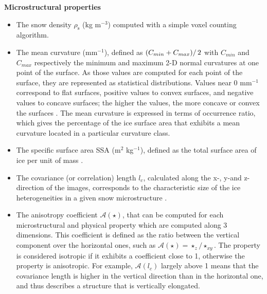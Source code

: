 \documentclass[draft,ms]{agujournal2019}
\begin{document}
\noindent \textbf{Microstructural properties} 
\begin{itemize}
    \item The snow density $\rho_{\mathrm{s}}$ (kg m$^{-3}$) computed with a simple voxel counting algorithm.
    
    \item The mean curvature (mm$^{-1}$), defined as $\left(C_{min} + C_{max})\right/2$ with $C_{min}$ and $C_{max}$ respectively the minimum and maximum 2-D normal curvatures at one point of the surface. As those values are computed for each point of the surface, they are represented as statistical distributions. Values near 0 mm$^{-1}$ correspond to flat surfaces, positive values to convex surfaces, and negative values to concave surfaces; the higher the values, the more concave or convex the surfaces \cite{ogawa2006representation}. The mean curvature is expressed in terms of occurrence ratio, which gives the percentage of the ice surface area that exhibits a mean curvature located in a particular curvature class.
    
    \item The specific surface area SSA (m$^2$ kg$^{-1}$), defined as the total surface area of ice per unit of mass \cite{dumont2021experimental, flin2011computations}.
    
    \item The covariance (or correlation) length $l_{c}$, calculated along the x-, y-and z- direction of the images, corresponds to the characteristic size of the ice heterogeneities in a given snow microstructure \cite{lowe2013general}. 
    
    \item The anisotropy coefficient
    $\mathcal{A}(\star)$, that can be computed for each microstructural and physical property which are computed along 3 dimensions. This coefficient is defined as the ratio between the vertical component over the horizontal ones, such as $\mathcal{A}(\star)=\star_{z} / \star_{x y}$. The property is considered isotropic if it exhibits a coefficient close to 1, otherwise the property is anisotropic. For example, $\mathcal{A}(l_c)$ largely above 1 means that the covariance length is higher in the vertical direction than in the horizontal one, and thus describes a structure that is vertically elongated.
\end{itemize}
\end{document}
